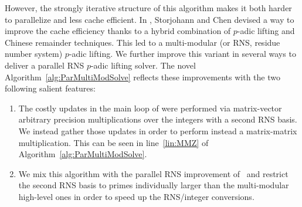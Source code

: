 However, the strongly iterative structure of this algorithm makes it both harder to parallelize and less cache
efficient.
In \cite{ChSt05}, Storjohann and Chen devised a way to improve the cache efficiency thanks to a hybrid combination of
$p$-adic lifting and Chinese remainder techniques.
This led to a multi-modular (or RNS, residue number system) $p$-adic
lifting.
We further improve this variant in several ways to deliver a parallel
RNS $p$-adic lifting solver. The novel
Algorithm~\ref{alg:ParMultiModSolve} reflects these improvements with
the two following salient features:
\begin{enumerate}
\item The costly updates in the main loop of \cite{ChSt05} were
  performed via matrix-vector arbitrary precision multiplications over
  the integers with a second RNS basis.
  We instead gather those updates in order to perform instead a
  matrix-matrix multiplication.
  This can be seen in line~\ref{lin:MMZ} of
  Algorithm~\ref{alg:ParMultiModSolve}.
\item We mix this algorithm with the parallel RNS improvement
  of~\cite{DGLS18} and restrict the second RNS basis to primes
  individually larger than the
  multi-modular high-level ones in order to speed up the RNS/integer
  conversions.
\end{enumerate}


